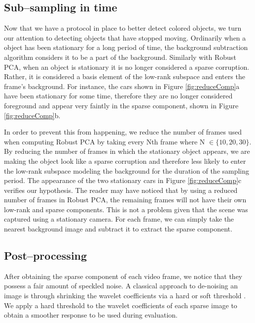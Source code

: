 \documentclass{article}
\begin{document}
\subsection{Sub--sampling in time}

Now that we have a protocol in place to better detect colored objects, we turn our attention to detecting objects that have stopped moving. Ordinarily when a object has been stationary for a long period of time, the background subtraction algorithm considers it  to be a part of the background. Similarly with  Robust PCA, when an object is stationary it is no longer considered a sparse corruption. Rather, it is considered a basis element of the low-rank subspace and enters the frame's background. For instance, the cars shown in Figure \ref{fig:reduceComp}a have been stationary for some time, therefore they are no longer considered foreground and appear very faintly in the sparse component, shown in Figure \ref{fig:reduceComp}b.
 
In order to prevent this from happening, we reduce the number of frames used when computing Robust PCA by taking every Nth frame where N $\in \{ 10, 20, 30\}$. By reducing the number of frames in which the stationary object appears, we are making the object look like a sparse corruption and therefore less likely to enter the low-rank subspace modeling the background for the duration of the sampling period. The appearance of the two stationary cars in Figure \ref{fig:reduceComp}c verifies our hypothesis. The reader may have noticed that by using a reduced number of frames in Robust PCA, the remaining frames will not have their own low-rank and sparse components. This is not a problem given that the scene was captured using a stationary camera. For each frame, we can simply take the nearest background image and subtract it to extract the sparse component.

\subsection{Post--processing}

After obtaining the sparse component of each video frame, we notice that they possess a fair amount of speckled noise. A classical approach to de-noising an image is through shrinking the wavelet coefficients via a hard or soft threshold \cite{Donoho95}. We apply a hard threshold to the wavelet coefficients of each sparse image to obtain a smoother response to be used during evaluation.
\end{document}
